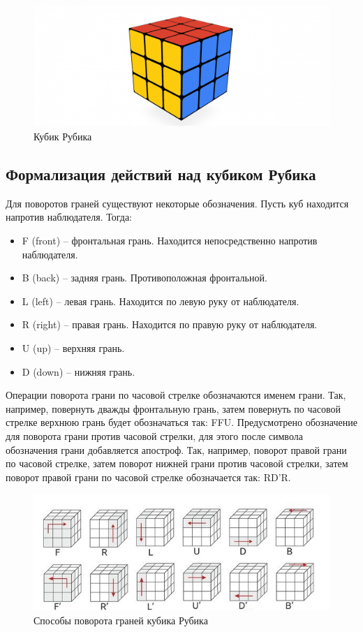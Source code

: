 \documentclass[a4paper, 14pt]{report}
\begin{document}
	\begin{figure}[ht]
		\centering
		\includegraphics[width=1\linewidth]{rubicks_cube}
		\caption{Кубик Рубика}
		\label{fig:rubicks_cube}
	\end{figure}

	\subsection{Формализация действий над кубиком Рубика}
	Для поворотов граней существуют некоторые обозначения. Пусть куб находится напротив наблюдателя. Тогда:
	
	\begin{itemize}
		\item F (front) – фронтальная грань. Находится непосредственно напротив наблюдателя.
		\item B (back) – задняя грань. Противоположная фронтальной.
		\item L (left) – левая грань. Находится по левую руку от наблюдателя.
		\item R (right) – правая грань. Находится по правую руку от наблюдателя.
		\item U (up) – верхняя грань.
		\item D (down) – нижняя грань.
	\end{itemize}

	Операции поворота грани по часовой стрелке обозначаются именем грани. Так, например, повернуть дважды фронтальную грань, затем повернуть по часовой стрелке верхнюю грань будет обозначаться так: FFU. Предусмотрено обозначение для поворота грани против часовой стрелки, для этого после символа обозначения грани добавляется апостроф. Так, например, поворот правой грани по часовой стрелке, затем поворот нижней грани против часовой стрелки, затем поворот правой грани по часовой стрелке обозначается так: RD’R.
	
	\begin{figure}[ht]
		\centering
		\includegraphics[width=1\linewidth]{cube_rotations}
		\caption{Способы поворота граней кубика Рубика}
		\label{fig:cube_rotations}
	\end{figure}
	
\end{document}
